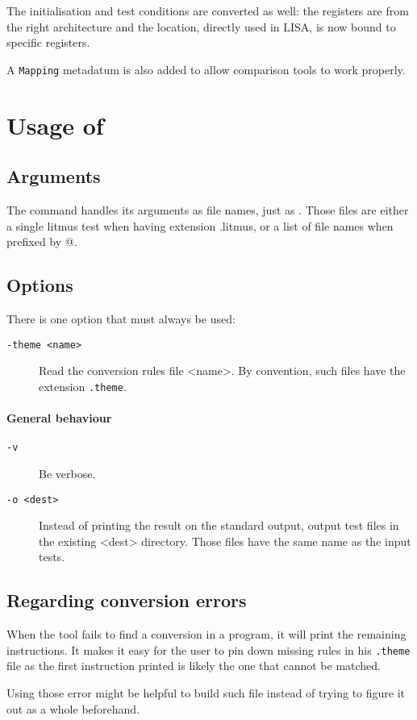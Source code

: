 The initialisation and test conditions are converted as well:
the registers are from the right architecture and
the location, directly used in LISA, is now bound to
specific registers.

A \verb+Mapping+ metadatum is also added to allow comparison tools
to work properly.

\section{Usage of \jingle{}}

\subsection{Arguments}
The command \jingle{} handles its arguments as file names, just as \herd{}.
Those files are either a single litmus test when having extension .litmus,
or a list of file names when prefixed by @.

\subsection{Options}
There is one option that must always be used:

\begin{description}
\item[{\tt -theme <name>}] Read the conversion rules file <name>.
By convention, such files have the extension \verb+.theme+.
\end{description}

\paragraph{General behaviour}
\begin{description}
\item[{\tt -v}] Be verbose.
\item[{\tt -o <dest>}] Instead of printing the result on the standard output,
output test files in the existing <dest> directory. Those files have the same
name as the input tests.
\end{description}

\subsection{Regarding conversion errors}
When the tool fails to find a conversion in a program, it will print the remaining instructions.
It makes it easy for the user to pin down missing rules in his \verb+.theme+ file
as the first instruction printed is likely the one that cannot be matched.

Using those error might be helpful to build such file instead of trying to figure it out
as a whole beforehand.
